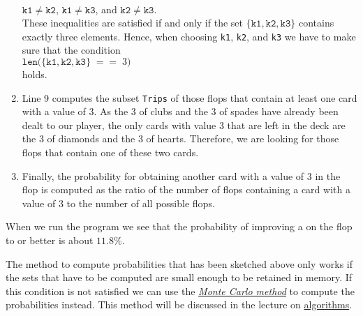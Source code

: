 \begin{enumerate}
      \\[0.2cm]
      \hspace*{1.3cm}
      $\mathtt{k1} \not= \mathtt{k2}$, \quad $\mathtt{k1} \not= \mathtt{k3}$,  \quad and \quad $\mathtt{k2} \not= \mathtt{k3}$.
      \\[0.2cm]
      These inequalities are satisfied if and only if the set 
      $\{ \mathtt{k1}, \mathtt{k2}, \mathtt{k3} \}$ contains exactly three elements.  Hence, when
      choosing \texttt{k1}, \texttt{k2}, and \texttt{k3} we have to make sure that the condition
      \\[0.2cm]
      \hspace*{1.3cm}
      $\texttt{len}\bigl({\{ \mathtt{k1}, \mathtt{k2}, \mathtt{k3} \} \;\mathtt{==}\; 3 }\bigr)$
      \\[0.2cm]
      holds.
\item Line 9 computes the subset \texttt{Trips} of those flops that contain at least one card with a value of 3.
      As the 3 of clubs and the 3 of spades have already been dealt to our player, the only cards
      with value 3 that are left in the deck are the 3 of diamonds and the 3 of hearts.  Therefore, we are looking for
      those flops that contain one of these two cards.
\item Finally, the probability for obtaining another card with a value of 3 in the flop is computed as
      the ratio of the number of flops containing a card with a value of 3 to the number of all possible flops.
\end{enumerate}
When we run the program we see that the probability of improving a  on the flop to  or better
is about  $11.8\%$.  

\remarkEng
The method to compute probabilities that has been sketched above only works if the sets that have to
be computed are small enough to be retained in memory.  If this condition is
not satisfied we can use the \href{https://en.wikipedia.org/wiki/Monte_Carlo_method}{\emph{Monte Carlo method}} 
to compute the probabilities instead.  This method will be discussed in the lecture on 
\href{https://github.com/karlstroetmann/Algorithms/blob/master/Lecture-Notes/algorithms.pdf}{algorithms}.


